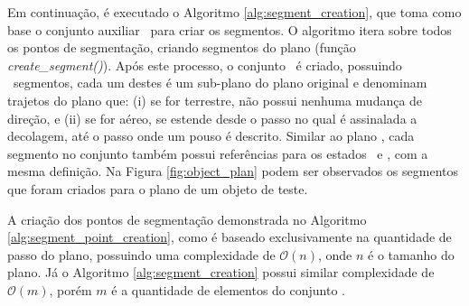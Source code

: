 Em continuação, é executado o Algoritmo \ref{alg:segment_creation}, que toma como base o conjunto auxiliar \segmentpointset\ para criar os segmentos. O algoritmo itera sobre todos os pontos de segmentação, criando segmentos do plano  (função \emph{create\_segment()}).
Após este processo, o conjunto \segmentlist\ é criado, possuindo \segmentsetqt\ segmentos, cada um destes é um sub-plano do plano original  e denominam trajetos do plano que: (i) se for terrestre, não possui nenhuma mudança de direção, e (ii) se for aéreo, se estende desde o passo no qual é assinalada a decolagem, até o passo onde um pouso é descrito.
Similar ao plano , cada segmento  no conjunto  também possui referências para os estados \originstate\ e \targetstate, com a mesma definição. Na Figura \ref{fig:object_plan} podem ser observados os segmentos que foram criados para o plano de um objeto de teste.

A criação dos pontos de segmentação demonstrada no Algoritmo \ref{alg:segment_point_creation}, como é baseado exclusivamente na quantidade de passo do plano, possuindo uma complexidade de $\mathcal{O}(n)$, onde $n$ é o tamanho do plano. Já o Algoritmo \ref{alg:segment_creation} possui similar complexidade de $\mathcal{O}(m)$, porém $m$ é a quantidade de elementos do conjunto \segmentpointset.


